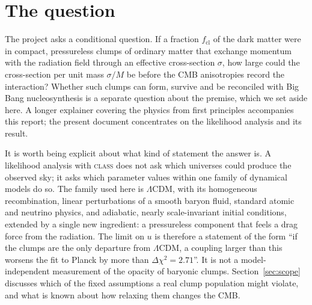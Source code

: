 \documentclass[11pt,a4paper]{article}
\newcommand{\cl}{\mathrm{cl}}
\newcommand{\dchi}{\Delta\chi^2}
\begin{document}
\section{The question}
\label{sec:question}

The project asks a conditional question. If a fraction $f_\cl$ of the dark matter were in compact, pressureless clumps of ordinary matter that exchange momentum with the radiation field through an effective cross-section $\sigma$, how large could the cross-section per unit mass $\sigma/M$ be before the CMB anisotropies record the interaction? Whether such clumps can form, survive and be reconciled with Big Bang nucleosynthesis is a separate question about the premise, which we set aside here. A longer explainer covering the physics from first principles accompanies this report; the present document concentrates on the likelihood analysis and its result.

It is worth being explicit about what kind of statement the answer is. A likelihood analysis with \textsc{class} does not ask which universes could produce the observed sky; it asks which parameter values within one family of dynamical models do so. The family used here is $\Lambda$CDM, with its homogeneous recombination, linear perturbations of a smooth baryon fluid, standard atomic and neutrino physics, and adiabatic, nearly scale-invariant initial conditions, extended by a single new ingredient: a pressureless component that feels a drag force from the radiation. The limit on $u$ is therefore a statement of the form ``if the clumps are the only departure from $\Lambda$CDM, a coupling larger than this worsens the fit to Planck by more than $\dchi = 2.71$''. It is not a model-independent measurement of the opacity of baryonic clumps. Section~\ref{sec:scope} discusses which of the fixed assumptions a real clump population might violate, and what is known about how relaxing them changes the CMB.
\end{document}
